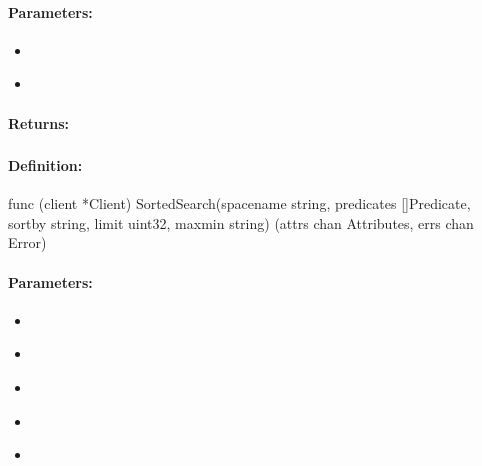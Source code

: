\paragraph{Parameters:}
\begin{itemize}[noitemsep]
\item {}\\

\item {}\\

\end{itemize}

\paragraph{Returns:}


\pagebreak
\subsubsection{}
\label{api:Go:SortedSearch}


\paragraph{Definition:}
\begin{gocode}
func (client *Client) SortedSearch(spacename string, predicates []Predicate, sortby string, limit uint32, maxmin string) (attrs chan Attributes, errs chan Error)
\end{gocode}

\paragraph{Parameters:}
\begin{itemize}[noitemsep]
\item {}\\

\item {}\\

\item {}\\

\item {}\\

\item {}\\

\end{itemize}

